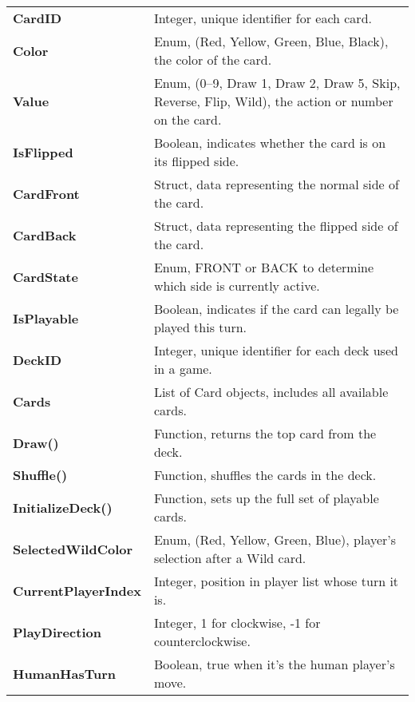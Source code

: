\begin{longtable}{|p{4cm}|p{11cm}|}
\textbf{CardID} & Integer, unique identifier for each card. \\
\textbf{Color} & Enum, (Red, Yellow, Green, Blue, Black), the color of the card. \\
\textbf{Value} & Enum, (0–9, Draw 1, Draw 2, Draw 5, Skip, Reverse, Flip, Wild), the action or number on the card. \\
\textbf{IsFlipped} & Boolean, indicates whether the card is on its flipped side. \\
\textbf{CardFront} & Struct, data representing the normal side of the card. \\
\textbf{CardBack} & Struct, data representing the flipped side of the card. \\
\textbf{CardState} & Enum, FRONT or BACK to determine which side is currently active. \\
\textbf{IsPlayable} & Boolean, indicates if the card can legally be played this turn. \\

\textbf{DeckID} & Integer, unique identifier for each deck used in a game. \\
\textbf{Cards} & List of Card objects, includes all available cards. \\
\textbf{Draw()} & Function, returns the top card from the deck. \\
\textbf{Shuffle()} & Function, shuffles the cards in the deck. \\
\textbf{InitializeDeck()} & Function, sets up the full set of playable cards. \\

\textbf{SelectedWildColor} & Enum, (Red, Yellow, Green, Blue), player’s selection after a Wild card. \\
\textbf{CurrentPlayerIndex} & Integer, position in player list whose turn it is. \\
\textbf{PlayDirection} & Integer, 1 for clockwise, -1 for counterclockwise. \\
\textbf{HumanHasTurn} & Boolean, true when it’s the human player’s move. \\
\end{longtable}
